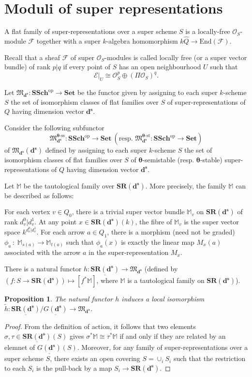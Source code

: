\documentclass[12pt, reqno]{amsart}
\theoremstyle{plain}
\newtheorem{proposition}[theorem]{Proposition}
\numberwithin{equation}{section}
\def \sd{\mathbf{d^s}}
\def \ra{\rightarrow}
\def \bfSR{\mathbf{SR}}
\def \btheta{\boldsymbol{\theta}}
\newcommand{\sheaf}[1]{\mathcal{#1}}
\newcommand{\stsheaf}[1]{\mathcal{O}_{#1}}
\newcommand{\smfss}{\mathfrak{M}_{\sd}^{\btheta\text{-}\mathrm{ss}}}
\newcommand{\smfs}{\mathfrak{M}_{\sd}^{\btheta\text{-}\mathrm{st}}}
\newcommand{\SSch}{\mathbf{SSch}}
\newcommand{\Set}{\mathbf{Set}}
\newcommand{\smf}{\mathfrak{M}_{\sd}}
\newcommand{\fp}[1]{\underline{#1}}%
\begin{document}
\section{Moduli of super representations}

A flat family of super-representations over a super scheme $S$ is a 
locally-free $\stsheaf{S}$-module $\sheaf{F}$ together with a super $k$-algebra
homomorphism $k\widehat{Q}\ra \mathrm{End}(\sheaf{F})$.

Recall that a sheaf $\mathcal{F}$ of super $\mathcal{O}_S$-modules is called locally free (or a super vector bundle) of rank $p|q$ if every point of $S$ has an open neighbourhood $U$ such that 
$$\mathcal{E}\vert _{U} \cong \mathcal{O}_S ^p \oplus (\Pi \mathcal{O}_S)^q.$$

Let $\smf \colon \SSch^\mathrm{op}\ra \Set$ be the functor given by 
assigning to each super $k$-scheme $S$ the set of isomorphism classes of 
flat families over $S$ of super-representations of $Q$ having dimension 
vector $\sd$.

Consider the following subfunctor 
$$
\smfss \colon \SSch^\text{op}\ra \Set ~(\mbox{resp. } 
\smfs \colon \SSch^\text{op}\ra \Set)
$$ 
of $\smf(\sd)$ defined by assigning to each super $k$-scheme $S$ the set 
of isomorphism classes of flat families over $S$ of $\btheta$-semistable 
(resp. $\btheta$-stable) super-representations of $Q$ having dimension 
vector $\sd$.

Let $\mathbb{M}$ be the tautological family over $\bfSR(\sd)$. 
More precisely, the family $\mathbb{M}$ can be described as follows: 

For each vertex $v\in Q_0$, there is a trivial super vector bundle
$\mathbb{M}_v$ on $\bfSR(\sd)$ of rank $d_v^0|d_v^1$.
At any point $x\in \bfSR(\sd)(k)$, the fibre of $\mathbb{M}_v$
is the super vector space $k^{d_v^0|d_v^1}$.
For each arrow $a\in Q_1$, there is a morphism (need not be graded)
$\phi_a \, \colon \; \mathbb{M}_{s(a)} \ra \mathbb{M}_{t(a)}$
such that $\phi_a(x)$ is exactly the linear map $M_x(a)$
associated with the arrow $a$ in the super-representation $M_x$.

There is a natural functor $h\colon \fp{\bfSR(\sd)} \ra \smf$ 
(defined by $(f\colon S\ra \bfSR(\sd)) \mapsto [f^*\mathbb{M}]$, 
where $\mathbb{M}$ is a tautological family on $\bfSR(\sd)$).

\begin{proposition}\label{pro-local-isom}
The natural functor $h$ induces a local isomorphism $\tilde{h}\colon \fp{\bfSR(\sd)}/\fp{G(\sd)} \ra \smf$.
\end{proposition}
\begin{proof}
From the definition of action, it follows that two elements 
$\sigma, \tau \in \fp{\bfSR(\sd)}(S)$ gives 
$\sigma^*\mathbb{M}\cong \tau^*\mathbb{M}$ if and only if they 
are related by an elemnet of $\fp{G(\sd)}(S)$. Moreover, for any 
family of super-representations over a super scheme $S$,
there exists an open covering $S = \cup_i S_i$ such that the 
restriction to each $S_i$ is the pull-back by a map $S_i \ra \bfSR(\sd)$.
\end{proof}
\end{document}
